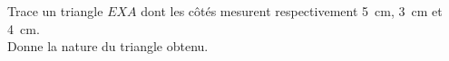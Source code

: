 %
%
	Trace un triangle \(EXA\) dont les côtés mesurent respectivement \SI{5}{cm}, \SI{3}{cm} et \SI{4}{cm}. \\
	Donne la nature du triangle obtenu.
